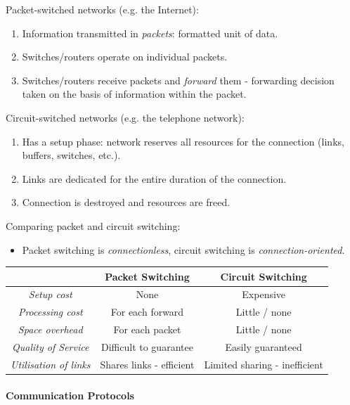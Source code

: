 \documentclass[twocolumn,english]{article}
\providecommand{\tabularnewline}{\\}
\providecommand{\tabularnewline}{\\}
\begin{document}
Packet-switched networks (e.g. the Internet):
\begin{enumerate}
\item Information transmitted in \emph{packets}: formatted unit of data.
\item Switches/routers operate on individual packets.
\item Switches/routers receive packets and \emph{forward} them - forwarding
decision taken on the basis of information within the packet.
\end{enumerate}
Circuit-switched networks (e.g. the telephone network):
\begin{enumerate}
\item Has a setup phase: network reserves all resources for the connection
(links, buffers, switches, etc.).
\item Links are dedicated for the entire duration of the connection.
\item Connection is destroyed and resources are freed.
\end{enumerate}
Comparing packet and circuit switching:
\begin{itemize}
\item Packet switching is \emph{connectionless}, circuit switching is \emph{connection-oriented}.
\end{itemize}
\begin{table}[H]
\centering{}%
\begin{tabular}{ccc}
\toprule 
 & \textbf{\footnotesize{}Packet Switching} & \textbf{\footnotesize{}Circuit Switching}\tabularnewline
\midrule
\emph{\footnotesize{}Setup cost} & {\footnotesize{}None} & {\footnotesize{}Expensive}\tabularnewline
\emph{\footnotesize{}Processing cost} & {\footnotesize{}For each forward} & {\footnotesize{}Little / none}\tabularnewline
\emph{\footnotesize{}Space overhead} & {\footnotesize{}For each packet} & {\footnotesize{}Little / none}\tabularnewline
\emph{\footnotesize{}Quality of Service} & {\footnotesize{}Difficult to guarantee} & {\footnotesize{}Easily guaranteed}\tabularnewline
\emph{\footnotesize{}Utilisation of links} & {\footnotesize{}Shares links - efficient} & {\footnotesize{}Limited sharing - inefficient}\tabularnewline
\bottomrule
\end{tabular}
\end{table}


\paragraph{Communication Protocols}
\end{document}
